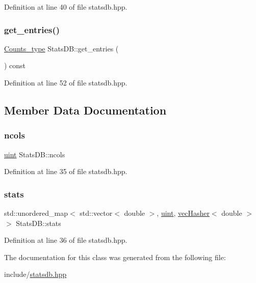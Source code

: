 Definition at line 40 of file statsdb.\+hpp.

\mbox{\label{class_stats_d_b_a8ed62f6a3939b90b3493de944c9b67fc}} 
\subsubsection{\texorpdfstring{get\+\_\+entries()}{get\_entries()}}
{\footnotesize\ttfamily \hyperlink{typedefs_8hpp_aee40fa17c1fddb63dd1f2b1470ade95b}{Counts\+\_\+type} Stats\+D\+B\+::get\+\_\+entries (\begin{DoxyParamCaption}{ }\end{DoxyParamCaption}) const\hspace{0.3cm}{\ttfamily [inline]}}



Definition at line 52 of file statsdb.\+hpp.



\subsection{Member Data Documentation}
\mbox{\label{class_stats_d_b_a4910142d21475182bdb326436bb59564}} 
\subsubsection{\texorpdfstring{ncols}{ncols}}
{\footnotesize\ttfamily \hyperlink{typedefs_8hpp_a91ad9478d81a7aaf2593e8d9c3d06a14}{uint} Stats\+D\+B\+::ncols}



Definition at line 35 of file statsdb.\+hpp.

\mbox{\label{class_stats_d_b_a675ecc967115b14bf8693858920a4a6c}} 
\subsubsection{\texorpdfstring{stats}{stats}}
{\footnotesize\ttfamily std\+::unordered\+\_\+map$<$ std\+::vector$<$ double $>$, \hyperlink{typedefs_8hpp_a91ad9478d81a7aaf2593e8d9c3d06a14}{uint}, \hyperlink{structvec_hasher}{vec\+Hasher}$<$ double $>$ $>$ Stats\+D\+B\+::stats}



Definition at line 36 of file statsdb.\+hpp.



The documentation for this class was generated from the following file\+:\begin{DoxyCompactItemize}
\item 
include/\hyperlink{statsdb_8hpp}{statsdb.\+hpp}\end{DoxyCompactItemize}
